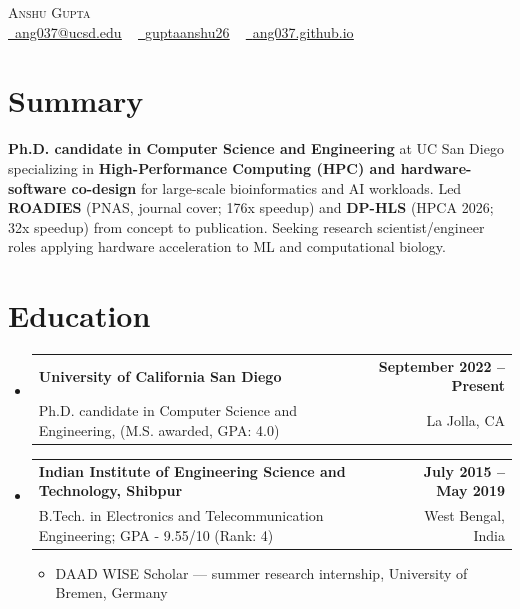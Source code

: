 \documentclass[letterpaper,11pt]{article}
\makeatletter
\newcommand{\resumeItem}[1]{
  \item{
    {#1 \vspace{-2pt}}
  }
}
\newcommand{\resumeSubheading}[4]{
  \vspace{-2pt}\item
    \begin{tabular*}{1.0\textwidth}[t]{l@{\extracolsep{\fill}}r}
      \textbf{#1} & \textbf{#2} \\
      #3 & #4 \\
    \end{tabular*}\vspace{-7pt}
}
\newcommand{\resumeSubHeadingListStart}{\begin{itemize}[leftmargin=0.0in, label={}]}
\newcommand{\resumeSubHeadingListEnd}{\end{itemize}}
\newcommand{\resumeItemListStart}{\begin{itemize}}
\newcommand{\resumeItemListEnd}{\end{itemize}\vspace{-5pt}}
\makeatother
\begin{document}

\begin{center}
    {\Huge \scshape Anshu Gupta} \\ \vspace{1pt}
    \small \href{mailto:ang037@ucsd.edu}{\raisebox{-0.2\height}\faEnvelope\  \underline{ang037@ucsd.edu}} ~ 
    \href{https://www.linkedin.com/in/guptaanshu26/}{\raisebox{-0.2\height}\faLinkedin\ \underline{guptaanshu26}}  ~
    \href{https://ang037.github.io/}{\raisebox{-0.2\height}\faGithub\ \underline{ang037.github.io}}
    \vspace{-8pt}
\end{center}

\section{Summary}


\textbf{Ph.D. candidate in Computer Science and Engineering} at UC San Diego specializing in \textbf{High-Performance Computing (HPC) and hardware-software co-design} for large-scale bioinformatics and AI workloads. Led \textbf{ROADIES} (PNAS, journal cover; 176x speedup) and \textbf{DP-HLS} (HPCA 2026; 32x speedup) from concept to publication. Seeking research scientist/engineer roles applying hardware acceleration to ML and computational biology.

\section{Education}
  \resumeSubHeadingListStart
    \resumeSubheading
      {University of California San Diego}{September 2022 -- Present}
      {Ph.D. candidate in Computer Science and Engineering, (M.S. awarded, GPA: 4.0)}{La Jolla, CA}
    \resumeSubheading
      {Indian Institute of Engineering Science and Technology, Shibpur}{July 2015 -- May 2019}
      {B.Tech. in Electronics and Telecommunication Engineering; GPA - 9.55/10 (Rank: 4)}{West Bengal, India}
      \resumeItemListStart
        \resumeItem{DAAD WISE Scholar --- summer research internship, University of Bremen, Germany}
      \resumeItemListEnd
  \resumeSubHeadingListEnd
\end{document}
